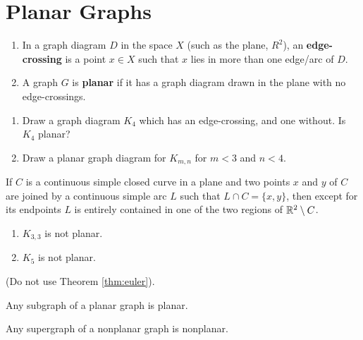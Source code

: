 \section{Planar Graphs} \label{sec:planar}
\begin{definition}\leavevmode
\begin{enumerate}
    \item In a graph diagram $D$ in the space $X$ (such as the plane, $R^2$), an \textbf{edge-crossing} is a point $x\in X$ such that $x$ lies in more than one edge/arc of $D$.
    \item A graph $G$ is \textbf{planar} if it has a graph diagram drawn in the plane with no edge-crossings.
\end{enumerate}
\end{definition}

\begin{examples}\leavevmode
\begin{enumerate}
    \item Draw a graph diagram $K_4$ which has an edge-crossing, and one without.  Is $K_4$ planar?
    \item Draw a planar graph diagram for $K_{m,n}$ for $m<3$ and $n<4$.
\end{enumerate}
\end{examples}

\begin{theorem} If $C$ is a continuous simple closed curve in a plane and two points $x$ and $y$ of $C$ are joined by a continuous simple arc $L$ such that $L \cap C = \{x, y\}$, then except for its endpoints $L$ is entirely contained in one of the two regions of $\mathbb{R}^2 \setminus C$.
\end{theorem}

\begin{theorem}\leavevmode
\begin{enumerate}
    \item $K_{3,3}$ is not planar.
    \item $K_5$ is not planar.
\end{enumerate}
(Do not use Theorem \ref{thm:euler}).
\end{theorem}

\begin{theorem} Any subgraph of a planar graph is planar.
\end{theorem}

\begin{corollary} Any supergraph of a nonplanar graph is nonplanar.
\end{corollary}

